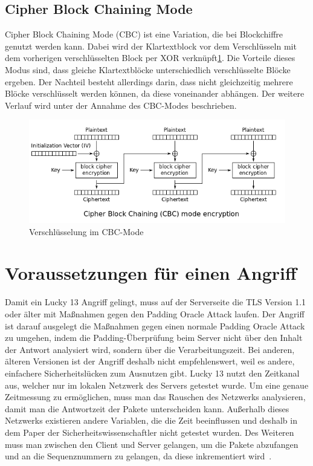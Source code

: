 \documentclass[a4paper,10pt]{scrartcl}
\begin{document}
    \subsection{Cipher Block Chaining Mode}\label{subsec:cbc-mode}
    Cipher Block Chaining Mode (CBC) ist eine Variation, die bei Blockchiffre genutzt werden kann.
    Dabei wird der Klartextblock vor dem Verschlüsseln mit dem vorherigen verschlüsselten Block per XOR verknüpft\ref{CBC_Mode}.
    Die Vorteile dieses Modus sind, dass gleiche Klartextblöcke unterschiedlich verschlüsselte Blöcke ergeben.
    Der Nachteil besteht allerdings darin, dass nicht gleichzeitig mehrere Blöcke verschlüsselt werden können, da diese voneinander abhängen.
    Der weitere Verlauf wird unter der Annahme des CBC-Modes beschrieben.
    \begin{figure}[h]
        \begin{center}
            \includegraphics[width=12cm]{./Literatur/documents/wo8Bl}\newline\caption{Verschlüsselung im CBC-Mode~\cite{CBC-verschluesseln}}
            \label{CBC_Mode}
        \end{center}
    \end{figure}


    \section{Voraussetzungen für einen Angriff}\label{sec:voraussetzungen-fur-einen-angriff}
    Damit ein Lucky 13 Angriff gelingt, muss auf der Serverseite die TLS Version 1.1 oder älter mit Maßnahmen gegen den Padding Oracle Attack laufen.
    Der Angriff ist darauf ausgelegt die Maßnahmen gegen einen normale Padding Oracle Attack zu umgehen, indem die Padding-Überprüfung beim Server nicht über den Inhalt der Antwort analysiert wird, sondern über die Verarbeitungszeit.
    Bei anderen, älteren Versionen ist der Angriff deshalb nicht empfehlenswert, weil es andere, einfachere Sicherheitslücken zum Ausnutzen gibt.
    \newline
    Lucky 13 nutzt den Zeitkanal aus, welcher nur im lokalen Netzwerk des Servers getestet wurde.
    Um eine genaue Zeitmessung zu ermöglichen, muss man das Rauschen des Netzwerks analysieren, damit man die Antwortzeit der Pakete unterscheiden kann.
    Außerhalb dieses Netzwerks existieren andere Variablen, die die Zeit beeinflussen und deshalb in dem Paper der Sicherheitswissenschaftler nicht getestet wurden.
    Des Weiteren muss man zwischen den Client und Server gelangen, um die Pakete abzufangen und an die Sequenznummern zu gelangen, da diese inkrementiert wird~\cite[S. 11]{AlFardan2013}.
\end{document}
